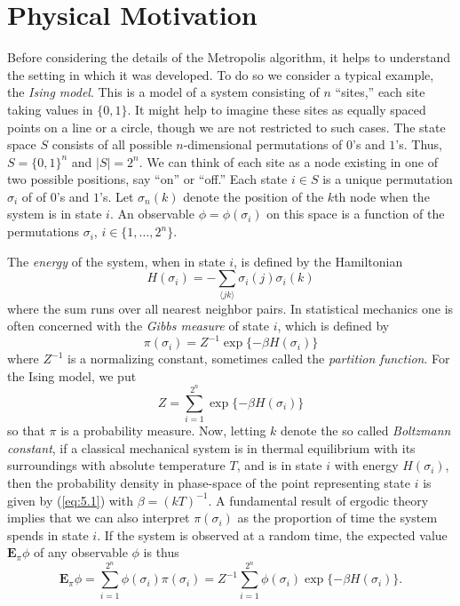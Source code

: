 \documentclass[12pt,letterpaper]{report}
\theoremstyle{plain}
\theoremstyle{definition}
\theoremstyle{remark}
\numberwithin{theorem}{chapter}
\numberwithin{claim}{chapter}
\numberwithin{equation}{chapter}
\numberwithin{conjecture}{chapter}
\newcommand\bE{\ensuremath{\mathbf{E}}}
\newcommand\<{\ensuremath{\langle}}
\renewcommand\>{\ensuremath{\rangle}}
\begin{document}
\section{Physical Motivation}
\label{sec:physical-motivation}
Before considering the details of the Metropolis algorithm, it helps to
understand the setting in which it was developed. To do so we consider a
typical example, the \emph{Ising model}. This is a model of a system consisting
of $n$ ``sites,'' each site taking values in 
$\{0, 1\}$. 
It might 
help to imagine these sites as equally spaced points on a line or a circle,
though we are not restricted to such cases. 
The state space $S$ consists of
all possible $n$-dimensional permutations of $0$'s and $1$'s. 
Thus, $S = \{0, 1\}^n$ and $|S| = 2^n$. We can think of each
site as a node existing in one of two possible positions, say ``on'' or
``off.'' Each state $i \in S$ is %
a unique permutation $\sigma_i$ of of $0$'s and $1$'s. 
Let $\sigma_n(k)$ denote the position %
of the $k$th node when the system is in state $i$. 
An observable $\phi = \phi(\sigma_i)$ on this space is a function of
the permutations $\sigma_i$, $i\in \{1,\dots, 2^n\}$.
%
%
%
%

The \emph{energy} of the system, when in state $i$, is defined by the Hamiltonian
\[
H(\sigma_i) = - \sum_{\<j k\>} \sigma_i(j)\sigma_i(k)
\]
where the sum runs over all nearest neighbor pairs. In statistical mechanics one is often concerned
with the \emph{Gibbs measure} of state $i$, which is defined by
\begin{equation}
\label{eq:5.1}
\pi(\sigma_i)= Z^{-1} \exp\{-\beta H(\sigma_i)\}
\end{equation}
where $Z^{-1}$ is a normalizing constant, sometimes called the \emph{partition function}. 
For the Ising model, we put  
\begin{equation*}
Z = \sum_{i=1}^{2^n}\exp\{-\beta H(\sigma_i)\}
\end{equation*}
so that $\pi$ is a probability measure. 
Now, letting $k$ denote the so called \emph{Boltzmann constant}, if a
classical mechanical system is in thermal equilibrium with its surroundings with
absolute temperature $T$, and is in state $i$ with energy $H(\sigma_i)$, then the
probability density in phase-space of the point representing state $i$ is given by
(\ref{eq:5.1}) with $\beta = (kT)^{-1}$. A fundamental result of ergodic theory 
implies that we can also interpret $\pi(\sigma_i)$ as the proportion of time the
system spends in state $i$. If the system is observed at a random time, the
expected value $\bE_\pi\phi$ of any observable $\phi$ is thus 
\begin{equation}
\label{eq:5.2}
\bE_\pi\phi = 
\sum_{i=1}^{2^n}\phi(\sigma_i) \pi(\sigma_i) = 
Z^{-1}\sum_{i=1}^{2^n}\phi(\sigma_i) \exp\{-\beta H(\sigma_i)\}.
\end{equation}
\end{document}
